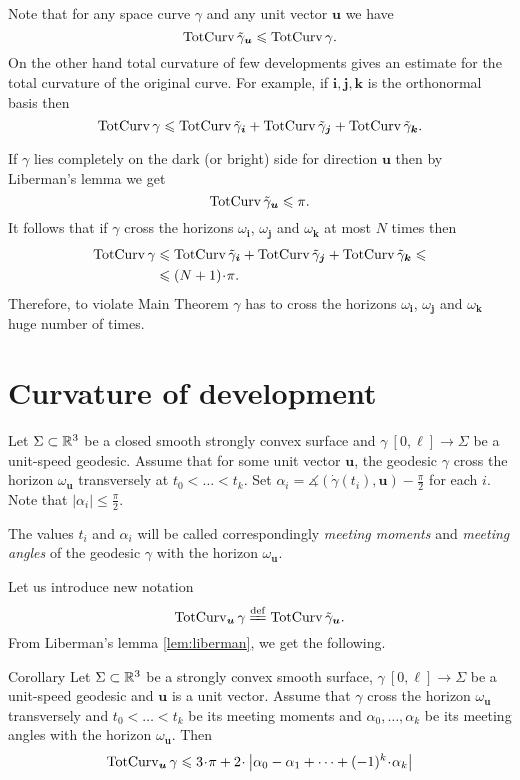 \documentclass[a4paper,10pt]{amsart}
\begin{document}
Note that for any space curve $\gamma$ and any unit vector $\bm{u}$
we have 
\[\mathop{\rm TotCurv}\nolimits\tilde\gamma_{\bm{u}}\leqslant\mathop{\rm TotCurv}\nolimits\gamma.\]
On the other hand total curvature of few developments gives an estimate 
for the total curvature of the original curve.
For example, if $\bm{i},\bm{j},\bm{k}$ is the orthonormal basis then
\[\mathop{\rm TotCurv}\nolimits\gamma
\leqslant
\mathop{\rm TotCurv}\nolimits\tilde\gamma_{\bm{i}}+\mathop{\rm TotCurv}\nolimits\tilde\gamma_{\bm{j}}+\mathop{\rm TotCurv}\nolimits\tilde\gamma_{\bm{k}}.\]

If $\gamma$ lies completely on the dark (or bright) side for direction $\bm{u}$
then by Liberman's lemma we get 
\[\mathop{\rm TotCurv}\nolimits\tilde\gamma_{\bm{u}}\leqslant \pi.\]
It follows that if $\gamma$ cross the horizons $\omega_{\bm{i}}$, $\omega_{\bm{j}}$ and $\omega_{\bm{k}}$
at most $N$ times then 
\begin{align*}
\tc\gamma
&\le
\tc\tilde\gamma_{\bm{i}}
+\tc\tilde\gamma_{\bm{j}}
+\tc\tilde\gamma_{\bm{k}}
\le
\\
&\le(N+1)\cdot \pi.
\end{align*}
Therefore, 
to violate Main Theorem 
$\gamma$ has to cross the  horizons $\omega_{\bm{i}}$, $\omega_{\bm{j}}$ and $\omega_{\bm{k}}$ huge number of times.

\section{Curvature of development}\label{sec:curv-develop}

Let $\Sigma\subset\mathbb{R}^3$
be a closed smooth strongly convex surface
and $\gamma\:[0,\ell]\to \Sigma$ be a unit-speed geodesic.
Assume that for some unit vector $\bm{u}$,
the geodesic $\gamma$ cross the horizon $\omega_{\bm{u}}$ transversely at 
$t_0<\dots <t_k$.
Set $\alpha_i=\measuredangle(\dot\gamma(t_i),\bm{u})-\tfrac\pi2$ for each $i$.
Note that $|\alpha_i|\le\tfrac\pi2$.

The values $t_i$ and  $\alpha_i$ 
will be called correspondingly \emph{meeting moments} 
and \emph{meeting angles}
of the geodesic $\gamma$ with the horizon $\omega_{\bm{u}}$.

Let us introduce new notation
\[\tc_{\bm{u}}\gamma\df\tc\tilde\gamma_{\bm{u}}.\]
From Liberman's lemma \ref{lem:liberman},
we get the following.

\begin{thm}{Corollary}\label{cor:liberman}
Let $\Sigma\subset\mathbb{R}^3$
be a strongly convex smooth surface,
$\gamma\:[0,\ell]\to \Sigma$ be a unit-speed geodesic
and $\bm{u}$ is a unit vector.
Assume that  $\gamma$ cross the horizon $\omega_{\bm{u}}$ transversely
and 
$t_0<\dots <t_k$ be its meeting moments 
and $\alpha_0,\dots,\alpha_k$ be its meeting angles with the horizon $\omega_{\bm{u}}$.
Then
\[\tc_{\bm{u}}\gamma
\le 3\cdot\pi
+
2\cdot\left|\alpha_0-\alpha_1
+\dots +(-1)^k\cdot\alpha_k\right|
\]

\end{thm}
\end{document}
